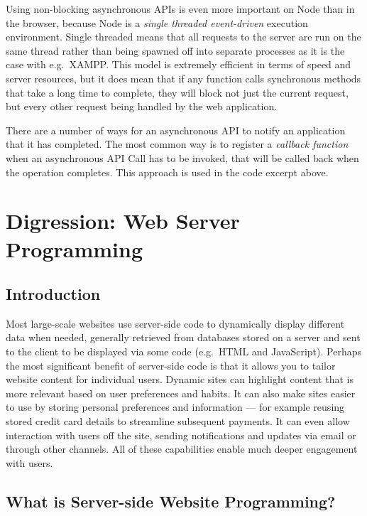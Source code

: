 \documentclass[a4paper, justified, notoc]{tufte-handout} %
\begin{document}
Using non-blocking asynchronous APIs is even more important on Node than in the browser, because Node is a \emph{single threaded event-driven} execution environment. Single threaded means that all requests to the server are run on the same thread rather than being spawned off into separate processes as it is the case with e.g.\ XAMPP. This model is extremely efficient in terms of speed and server resources, but it does mean that if any function calls synchronous methods that take a long time to complete, they will block not just the current request, but every other request being handled by the web application.

There are a number of ways for an asynchronous API to notify an application that it has completed. The most common way is to register a \emph{callback function} when an asynchronous API Call has to be invoked, that will be called back when the operation completes. This approach is used in the code excerpt above.




\section{Digression: Web Server Programming} %
\label{sec:web_server_programming}


\subsection{Introduction} %

Most large-scale websites use server-side code to dynamically display different data when needed, generally retrieved from databases stored on a server and sent to the client to be displayed via some code (e.g.\ HTML and JavaScript). Perhaps the most significant benefit of server-side code is that it allows you to tailor website content for individual users. Dynamic sites can highlight content that is more relevant based on user preferences and habits. It can also make sites easier to use by storing personal preferences and information — for example reusing stored credit card details to streamline subsequent payments. It can even allow interaction with users off the site, sending notifications and updates via email or through other channels. All of these capabilities enable much deeper engagement with users.


\subsection{What is Server-side Website Programming?}
\label{sub:what_is_server_side_website_programming}
\end{document}
